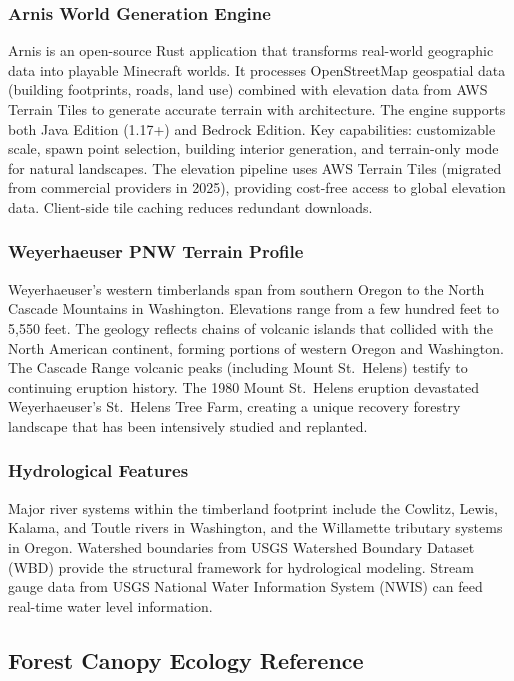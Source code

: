 \documentclass[11pt,letterpaper]{article}
\begin{document}
\subsubsection{Arnis World Generation Engine}
Arnis is an open-source Rust application that transforms real-world geographic data into playable Minecraft worlds. It processes OpenStreetMap geospatial data (building footprints, roads, land use) combined with elevation data from AWS Terrain Tiles to generate accurate terrain with architecture. The engine supports both Java Edition (1.17+) and Bedrock Edition. Key capabilities: customizable scale, spawn point selection, building interior generation, and terrain-only mode for natural landscapes. The elevation pipeline uses AWS Terrain Tiles (migrated from commercial providers in 2025), providing cost-free access to global elevation data. Client-side tile caching reduces redundant downloads.

\subsubsection{Weyerhaeuser PNW Terrain Profile}
Weyerhaeuser's western timberlands span from southern Oregon to the North Cascade Mountains in Washington. Elevations range from a few hundred feet to 5,550 feet. The geology reflects chains of volcanic islands that collided with the North American continent, forming portions of western Oregon and Washington. The Cascade Range volcanic peaks (including Mount St.\ Helens) testify to continuing eruption history. The 1980 Mount St.\ Helens eruption devastated Weyerhaeuser's St.\ Helens Tree Farm, creating a unique recovery forestry landscape that has been intensively studied and replanted.

\subsubsection{Hydrological Features}
Major river systems within the timberland footprint include the Cowlitz, Lewis, Kalama, and Toutle rivers in Washington, and the Willamette tributary systems in Oregon. Watershed boundaries from USGS Watershed Boundary Dataset (WBD) provide the structural framework for hydrological modeling. Stream gauge data from USGS National Water Information System (NWIS) can feed real-time water level information.

\subsection{Forest Canopy Ecology Reference}
\end{document}
